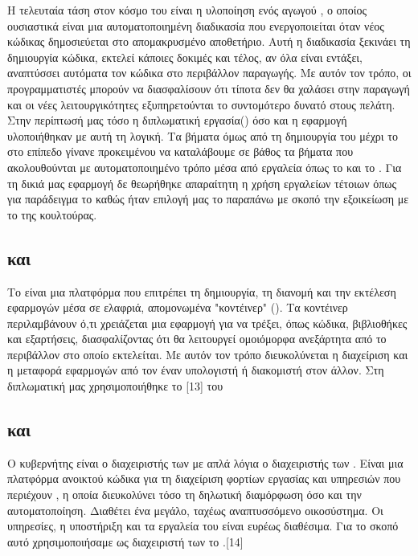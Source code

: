 Η τελευταία τάση στον κόσμο του  είναι η υλοποίηση ενός αγωγού , ο οποίος ουσιαστικά
είναι μια αυτοματοποιημένη διαδικασία που ενεργοποιείται όταν νέος κώδικας δημοσιεύεται στο
απομακρυσμένο αποθετήριο. Αυτή η διαδικασία ξεκινάει τη δημιουργία κώδικα, εκτελεί κάποιες δοκιμές και
τέλος, αν όλα είναι εντάξει, αναπτύσσει αυτόματα τον κώδικα στο
περιβάλλον παραγωγής. Με αυτόν τον τρόπο, οι προγραμματιστές μπορούν να διασφαλίσουν ότι τίποτα δεν θα χαλάσει
στην παραγωγή και οι νέες λειτουργικότητες εξυπηρετούνται το συντομότερο δυνατό στους
πελάτη. Στην περίπτωσή μας τόσο η διπλωματική εργασία() όσο και η εφαρμογή υλοποιήθηκαν με αυτή τη λογική. Τα βήματα όμως
από τη δημιουργία του  μέχρι το  στο  επίπεδο γίνανε  προκειμένου να καταλάβουμε σε βάθος 
τα βήματα που ακολουθούνται με αυτοματοποιημένο τρόπο μέσα από εργαλεία όπως το  και το . Για τη δικιά μας εφαρμογή δε θεωρήθηκε απαραίτητη η χρήση εργαλείων  τέτοιων όπως για παράδειγμα το  καθώς ήταν επιλογή μας
το παραπάνω με σκοπό την εξοικείωση με το  της  κουλτούρας.



\subsection{ και }

Το  είναι μια πλατφόρμα που επιτρέπει τη δημιουργία, τη διανομή και την εκτέλεση εφαρμογών μέσα σε ελαφριά, απομονωμένα "κοντέινερ" (). 
Τα κοντέινερ περιλαμβάνουν ό,τι χρειάζεται μια εφαρμογή για να τρέξει, όπως κώδικα, βιβλιοθήκες και εξαρτήσεις, διασφαλίζοντας ότι θα λειτουργεί ομοιόμορφα 
ανεξάρτητα από το περιβάλλον στο οποίο εκτελείται. Με αυτόν τον τρόπο διευκολύνεται η διαχείριση και η μεταφορά εφαρμογών από τον έναν υπολογιστή ή διακομιστή 
στον άλλον. Στη διπλωματική μας χρησιμοποιήθηκε το [13] του 

\subsection{ και }

Ο κυβερνήτης είναι ο διαχειριστής των με απλά λόγια ο διαχειριστής των . Είναι μια 
πλατφόρμα ανοικτού κώδικα για τη διαχείριση φορτίων εργασίας και υπηρεσιών που περιέχουν 
, η οποία διευκολύνει τόσο τη δηλωτική διαμόρφωση όσο και την αυτοματοποίηση. 
Διαθέτει ένα μεγάλο, ταχέως αναπτυσσόμενο οικοσύστημα. Οι υπηρεσίες, η υποστήριξη και τα εργαλεία του  είναι ευρέως διαθέσιμα. Για το σκοπό αυτό χρησιμοποιήσαμε ως διαχειριστή των  το .[14]





